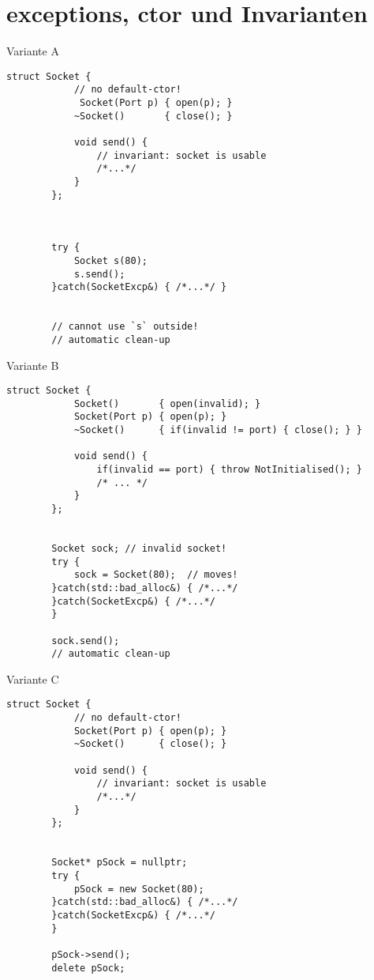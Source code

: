 \section{exceptions, ctor und Invarianten}

\begin{frame}[t, fragile]{ Variante A }
	\begin{lstlisting}[basicstyle=\scriptsize]
		struct Socket {
		    // no default-ctor!
		     Socket(Port p) { open(p); }
		    ~Socket()       { close(); }
			
		    void send() {
		        // invariant: socket is usable
		        /*...*/
		    }
		};
		
		
		
		try {
		    Socket s(80);
		    s.send();
		}catch(SocketExcp&) { /*...*/ }
		
		
		// cannot use `s` outside!
		// automatic clean-up
	\end{lstlisting}
\end{frame}

\begin{frame}[t, fragile]{ Variante B }
	\begin{lstlisting}[basicstyle=\scriptsize]
		struct Socket {
		    Socket()       { open(invalid); }
		    Socket(Port p) { open(p); }
		    ~Socket()      { if(invalid != port) { close(); } }
			
		    void send() {
		        if(invalid == port) { throw NotInitialised(); }
		        /* ... */
		    }
		};
		
		
		Socket sock; // invalid socket!
		try {
		    sock = Socket(80);	// moves!
		}catch(std::bad_alloc&) { /*...*/
		}catch(SocketExcp&) { /*...*/
		}
		
		sock.send();
		// automatic clean-up
	\end{lstlisting}
\end{frame}

\begin{frame}[t, fragile]{ Variante C }
	\begin{lstlisting}[basicstyle=\scriptsize]
		struct Socket {
		    // no default-ctor!
		    Socket(Port p) { open(p); }
		    ~Socket()      { close(); }
			
		    void send() {
		        // invariant: socket is usable
		        /*...*/
		    }
		};
		
		
		Socket* pSock = nullptr;
		try {
		    pSock = new Socket(80);
		}catch(std::bad_alloc&) { /*...*/
		}catch(SocketExcp&) { /*...*/
		}
		
		pSock->send();
		delete pSock;
	\end{lstlisting}
\end{frame}

